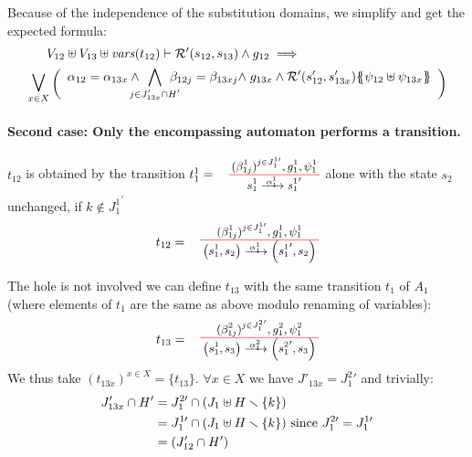 \documentclass[runningheads]{llncs}
\begin{document}
\begin{enumerate}
Because of the independence of the substitution domains, we simplify and get the expected formula:
\begin{multline*}
V_{12} \uplus V_{13}  \uplus \fvars{t_{12}} \vdash
\mathcal{R}'\mpar{s_{12}, s_{13}} \wedge g_{12} 
\implies \hspace{10em}\\ \operatorname*{\bigsymb{\bigvee}}_{x \in X} \mpar{\everymath{\displaystyle}
\begin{array}{l}
			\alpha_{12} = \alpha_{13x} \wedge \bigwedge_\subbox{j \in J'_{13x} \cap H'} \beta_{12j} = \beta_{13xj} \nwedge g_{13x} \wedge 
			 \mathcal{R}'\mpar{s'_{12}, s'_{13x}}\psubst{\psi_{12} \uplus \psi_{13x}}
		\end{array}}   
\end{multline*}	

\paragraph{Second case: Only the encompassing automaton performs a transition.}
  $t_{12}$ is obtained by the transition 
$t^1_1=\OT{ s^1_1}{{s^1_1}'}{\alpha_1^1}{{(\beta^1_{1j})^{j \in J^{1 \prime}_1} }}{ g^1_1 }{ \psi^1_1}$  alone with the state $s_2$ unchanged, if $k \not\in {J^1_{1}}^{\prime}$
\[t_{12} = \OT{\mpar{s^1_1, s_2}}{\mpar{{s^1_1}', s_2}}{\alpha_1^1}{ {(\beta^1_{1j})^{j \in J^{1 \prime}_1} }}{g^1_1}{\psi^1_1}
\]
 

The hole is not involved we can define $t_{13}$ with the same transition $t_1$ of $A_1$ (where elements of $t_1$ are the same as above modulo renaming of variables):
\[t_{13} = \OT{\mpar{s^1_1, s_3}}{\mpar{{s^2_1}', s_3}}{\alpha_1^2}{ {(\beta^2_{1j})^{j \in {J^{2}_1}'} }}{g^2_1}{\psi^2_1}
\]
We thus take $({t_{13 x}})^{x\in X} = \{t_{13}\}$.
$\forall x \in X$ we have $J'_{13x} =  {J^{2}_1}'$ and trivially:
\begin{align*}		
J'_{13x} \cap H' & =  J^{2 \prime}_1 \cap {\left(J_1 \uplus H \smallsetminus{\left\{k\right\}}\right)} \\
& =  J^{1 \prime}_1 \cap {\left(J_1 \uplus H \smallsetminus{\left\{k\right\}}\right)} \text{ since }  J^{2 \prime}_1 =  J^{1 \prime}_1\\
& = {\left(J'_{12}\cap H' \right)}
\end{align*}




\end{enumerate}
\end{document}
